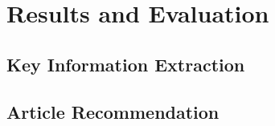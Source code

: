 \chapter{Results and Evaluation}
\section{Key Information Extraction}
\section{Article Recommendation}
